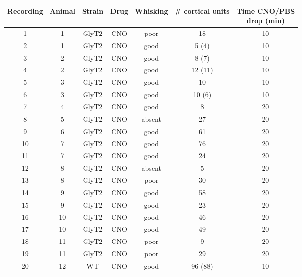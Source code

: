 \documentclass{article}
\begin{document}
  \begin{longtable}{|c|c|c|c|c|c|c|}
    \captionsetup{width=.8\linewidth}
    \hline
    Recording &  Animal  &   Strain   &   Drug   &  Whisking  & \# cortical units & \makecell{Time CNO/PBS \\ drop (min)}\\
    \hline
    \hline
    \rowcolor{mypink}1 & 1 & GlyT2 & CNO & poor & 18 & 10\\
    \hline
    \rowcolor{mypink}2 & 1 & GlyT2 & CNO & good & 5 (4) & 10\\
    \hline
    \rowcolor{mypink}3 & 2 & GlyT2 & CNO & good & 8 (7) & 10\\
    \hline
    \rowcolor{mypink}4 & 2 & GlyT2 & CNO & good & 12 (11) & 10\\
    \hline
    \rowcolor{mypink}5 & 3 & GlyT2 & CNO & good & 10 & 10\\
    \hline
    \rowcolor{mypink}6 & 3 & GlyT2 & CNO & good & 10 (6) & 10\\
    \hline
    \rowcolor{mypink}7 & 4 & GlyT2 & CNO & good & 8  & 20\\
    \hline
    \rowcolor{mypink}8 & 5 & GlyT2 & CNO & absent & 27  & 20\\
    \hline
    \rowcolor{mypink}9 & 6 & GlyT2 & CNO & good & 61  & 20\\
    \hline
    \rowcolor{mypink}10 & 7 & GlyT2 & CNO & good & 76  & 20\\
    \hline
    \rowcolor{mypink}11 & 7 & GlyT2 & CNO & good & 24  & 20\\
    \hline
    \rowcolor{mypink}12 & 8 & GlyT2 & CNO & absent & 5  & 20\\
    \hline
    \rowcolor{mypink}13 & 8 & GlyT2 & CNO & poor & 30  & 20\\
    \hline
    \rowcolor{mypink}14 & 9 & GlyT2 & CNO & good & 58  & 20\\
    \hline
    \rowcolor{mypink}15 & 9 & GlyT2 & CNO & good & 23  & 20\\
    \hline
    \rowcolor{mypink}16 & 10 & GlyT2 & CNO & good & 46  & 20\\
    \hline
    \rowcolor{mypink}17 & 10 & GlyT2 & CNO & good & 49  & 20\\
    \hline
    \rowcolor{mypink}18 & 11 & GlyT2 & CNO & poor & 9  & 20\\
    \hline
    \rowcolor{mypink}19 & 11 & GlyT2 & CNO & poor & 29  & 20\\
    \hline
    \rowcolor{myblue}20 & 12 & WT & CNO & good & 96 (88)  & 10\\

\end{longtable}
\end{document}
